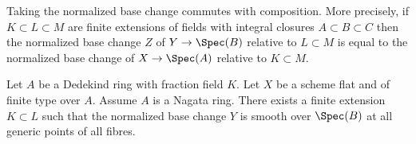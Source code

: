\medskip\noindent
Taking the normalized base change commutes with composition.
More precisely, if $K \subset L \subset M$ are finite extensions
of fields with integral closures $A \subset B \subset C$
then the normalized base change $Z$ of $Y \to \Spec(B)$
relative to $L \subset M$ is equal to the normalized base change
of $X \to \Spec(A)$ relative to $K \subset M$.

\begin{theorem}
\label{theorem-normalized-base-change-with-reduced-fibre}
Let $A$ be a Dedekind ring with fraction field $K$.
Let $X$ be a scheme flat and of finite type over $A$.
Assume $A$ is a Nagata ring.
There exists a finite extension $K \subset L$ such that
the normalized base change $Y$ is smooth over $\Spec(B)$
at all generic points of all fibres.
\end{theorem}

